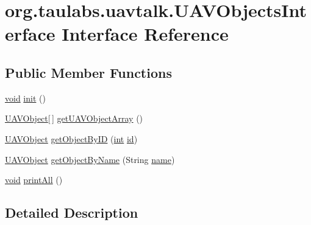 \hypertarget{interfaceorg_1_1taulabs_1_1uavtalk_1_1_u_a_v_objects_interface}{\section{org.\-taulabs.\-uavtalk.\-U\-A\-V\-Objects\-Interface Interface Reference}
\label{interfaceorg_1_1taulabs_1_1uavtalk_1_1_u_a_v_objects_interface}
}
\subsection*{Public Member Functions}
\begin{DoxyCompactItemize}
\item 
\hyperlink{group___u_a_v_objects_plugin_ga444cf2ff3f0ecbe028adce838d373f5c}{void} \hyperlink{interfaceorg_1_1taulabs_1_1uavtalk_1_1_u_a_v_objects_interface_ace7abcc9e1c30961f93208d326cd34d1}{init} ()
\item 
\hyperlink{classorg_1_1taulabs_1_1uavtalk_1_1_u_a_v_object}{U\-A\-V\-Object}\mbox{[}$\,$\mbox{]} \hyperlink{interfaceorg_1_1taulabs_1_1uavtalk_1_1_u_a_v_objects_interface_a9eae9614a5916c6123a8429e33d891dd}{get\-U\-A\-V\-Object\-Array} ()
\item 
\hyperlink{classorg_1_1taulabs_1_1uavtalk_1_1_u_a_v_object}{U\-A\-V\-Object} \hyperlink{interfaceorg_1_1taulabs_1_1uavtalk_1_1_u_a_v_objects_interface_a7be79110e6ad70ae659a2efa96316836}{get\-Object\-By\-I\-D} (\hyperlink{ioapi_8h_a787fa3cf048117ba7123753c1e74fcd6}{int} \hyperlink{glext_8h_a58c2a664503e14ffb8f21012aabff3e9}{id})
\item 
\hyperlink{classorg_1_1taulabs_1_1uavtalk_1_1_u_a_v_object}{U\-A\-V\-Object} \hyperlink{interfaceorg_1_1taulabs_1_1uavtalk_1_1_u_a_v_objects_interface_a98c4aea734aab8a13536083f6a7057dd}{get\-Object\-By\-Name} (String \hyperlink{glext_8h_ad977737dfc9a274a62741b9500c49a32}{name})
\item 
\hyperlink{group___u_a_v_objects_plugin_ga444cf2ff3f0ecbe028adce838d373f5c}{void} \hyperlink{interfaceorg_1_1taulabs_1_1uavtalk_1_1_u_a_v_objects_interface_a887c4e03836e580835619b29ec1154d2}{print\-All} ()
\end{DoxyCompactItemize}


\subsection{Detailed Description}


